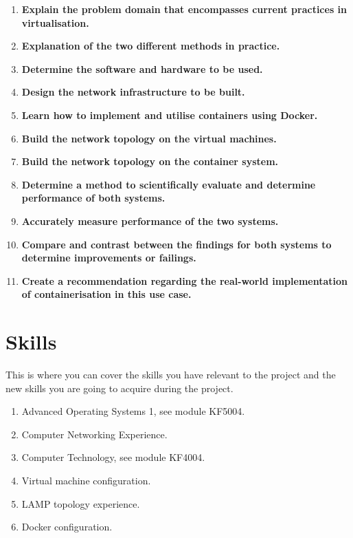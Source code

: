 \begin{enumerate}
	\item \label{itm:problemdomain} \textbf{Explain the problem domain that encompasses current practices in virtualisation.}
	\item \label{itm:explainmethods} \textbf{Explanation of the two different methods in practice.}
	\item \label{itm:softwarehardware} \textbf{Determine the software and hardware to be used.}
	\item \label{itm:infrastructure} \textbf{Design the network infrastructure to be built.}
	\item \label{itm:learndocker} \textbf{Learn how to implement and utilise containers using Docker.}
	\item \label{itm:buildvirtual} \textbf{Build the network topology on the virtual machines.}
	\item \label{itm:buildcontainer} \textbf{Build the network topology on the container system.}
	\item \label{itm:determinemethod} \textbf{Determine a method to scientifically evaluate and determine performance of both systems.}
	\item \label{itm:measure} \textbf{Accurately measure performance of the two systems.}
	\item \label{itm:comparison} \textbf{Compare and contrast between the findings for both systems to determine improvements or failings.}
	\item \label{itm:conclusion} \textbf{Create a recommendation regarding the real-world implementation of containerisation in this use case.}
\end{enumerate}

\section{Skills}
This is where you can cover the skills you have relevant to the project and the new skills you are going to acquire during the project.
\begin{enumerate}
	\item Advanced Operating Systems 1, see module KF5004.
	\item Computer Networking Experience.
	\item Computer Technology, see module KF4004.
	\item Virtual machine configuration.
	\item LAMP topology experience.
	\item Docker configuration.
\end{enumerate}

